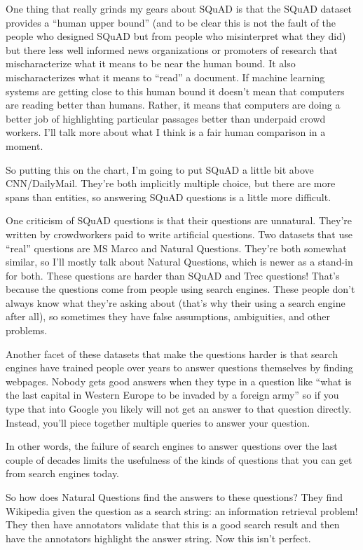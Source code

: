 One thing that really grinds my gears about SQuAD is that the SQuAD dataset provides a “human upper bound” (and to be clear this is not the fault of the people who designed SQuAD but from people who misinterpret what they did) but there less well informed news organizations or promoters of research that mischaracterize what it means to be near the human bound.  It also mischaracterizes what it means to “read” a document.  If machine learning systems are getting close to this human bound it doesn't mean that computers are reading better than humans.  Rather, it means that computers are doing a better job of highlighting particular passages better than underpaid crowd workers.  I’ll talk more about what I think is a fair human comparison in a moment.

So putting this on the chart, I’m going to put SQuAD a little bit above CNN/DailyMail.  They’re both implicitly multiple choice, but there are more spans than entities, so answering SQuAD questions is a little more difficult.

One criticism of SQuAD questions is that their questions are unnatural.  They’re written by crowdworkers paid to write artificial questions.  Two datasets that use “real” questions are MS Marco and Natural Questions.  They’re both somewhat similar, so I’ll mostly talk about Natural Questions, which is newer as a stand-in for both.  These questions are harder than SQuAD and Trec questions!  That’s because the questions come from people using search engines.  These people don’t always know what they’re asking about (that’s why their using a search engine after all), so sometimes they have false assumptions, ambiguities, and other problems.  

Another facet of these datasets that make the questions harder is that search engines have trained people over years to answer questions themselves by finding webpages.  Nobody gets good answers when they type in a question like “what is the last capital in Western Europe to be invaded by a foreign army” so if you type that into Google you likely will not get an answer to that question directly.  Instead, you’ll piece together multiple queries to answer your question.

In other words, the failure of search engines to answer questions over the last couple of decades limits the usefulness of the kinds of questions that you can get from search engines today.  

So how does Natural Questions find the answers to these questions?  They find Wikipedia given the question as a search string: an information retrieval problem!  They then have annotators validate that this is a good search result and then have the annotators highlight the answer string.  Now this isn’t perfect.  


